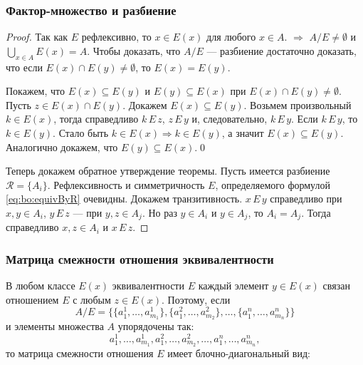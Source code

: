 \begin{frame}
    \frametitle{Фактор-множество и разбиение}
    
    \begin{proof}
        Так как $E$ рефлексивно, то $x\in E(x)$ для любого $x\in A$. $\Rightarrow$ $A/E\neq\emptyset$ и $\bigcup_{x\in A}E(x)=A$. Чтобы доказать, что $A/E$ --- разбиение достаточно доказать, что если $E(x)\cap E(y)\neq\emptyset$, то $E(x)=E(y)$.
        
        Покажем, что $E(x)\subseteq E(y)$ и $E(y)\subseteq E(x)$ при $E(x)\cap E(y)\neq\emptyset$. Пусть $z\in E(x)\cap E(y)$. Докажем $E(x)\subseteq E(y)$. Возьмем произвольный $k\in E(x)$, тогда справедливо $k\,E\,z$, $z\,E\,y$ и, следовательно, $k\,E\,y$. Если $k\,E\,y$, то $k\in E(y)$. Стало быть $k\in E(x)\Rightarrow k\in E(y)$, а значит $E(x)\subseteq E(y)$. Аналогично докажем, что $E(y)\subseteq E(x)$.\qed
        
        Теперь докажем обратное утверждение теоремы. Пусть имеется разбиение $\mathcal{R}=\{A_i\}$. Рефлексивность и симметричность $E$, определяемого формулой \eqref{eq:bo:equivByR} очевидны. Докажем транзитивность. $x\,E\,y$ справедливо при $x,y\in A_i$, $y\,E\,z$ --- при $y,z\in A_j$. Но раз $y\in A_i$ и $y\in A_j$, то $A_i=A_j$. Тогда справедливо $x,z\in A_i$ и $x\,E\,z$.
    \end{proof}
\end{frame}

\begin{frame}
    \frametitle{Матрица смежности отношения эквивалентности}
    
    В любом классе $E(x)$ эквивалентности $E$ каждый элемент $y\in E(x)$ связан отношением $E$ с любым $z\in E(x)$. Поэтому, если 
    \[
        A/E=\{\{a^1_1,\ldots,a^1_{m_1}\},\{a^2_1,\ldots,a^2_{m_2}\},\ldots,\{a^n_1,\ldots,a^n_{m_n}\}\}
    \]
    и элементы множества $A$ упорядочены так:
    \[
        a^1_1,\ldots,a^1_{m_1},a^2_1,\ldots,a^2_{m_2},\ldots,a^n_1,\ldots,a^n_{m_n},
    \]
    то матрица смежности отношения $E$ имеет блочно-диагональный вид:
\end{frame}

